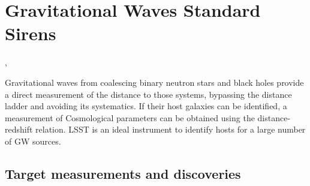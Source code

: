 %
%
%

\section{Gravitational Waves Standard Sirens}
\def\secname{lenstimedelays}\label{sec:\secname}

,

Gravitational waves from coalescing binary neutron stars and  
black holes provide a direct measurement of the 
distance to those systems, bypassing the distance ladder and 
avoiding its systematics. 
If their host galaxies can be identified, a measurement of Cosmological 
parameters can be obtained using the distance-redshift relation. 
LSST is an ideal instrument to identify hosts for a large number of  
GW sources. 



\subsection{Target measurements and discoveries}
\label{sec:\secname:targets}

